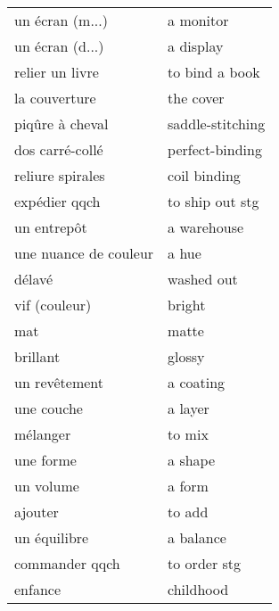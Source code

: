 \documentclass[
  10pt,
]{article}
\begin{document}
\begin{longtable}{ll}
un écran (m...) & a monitor\\

\rowcolor{gray!6}  un écran (d...) & a display\\

relier un livre & to bind a book\\

\rowcolor{gray!6}  la couverture & the cover\\

piqûre à cheval & saddle-stitching\\

\rowcolor{gray!6}  dos carré-collé & perfect-binding\\

reliure spirales & coil binding\\

\rowcolor{gray!6}  expédier qqch & to ship out stg\\

un entrepôt & a warehouse\\

\rowcolor{gray!6}  une nuance de couleur & a hue\\

délavé & washed out\\

\rowcolor{gray!6}  vif (couleur) & bright\\

mat & matte\\

\rowcolor{gray!6}  brillant & glossy\\

un revêtement & a coating\\

\rowcolor{gray!6}  une couche & a layer\\

mélanger & to mix\\

\rowcolor{gray!6}  une forme & a shape\\

un volume & a form\\

\rowcolor{gray!6}  ajouter & to add\\

un équilibre & a balance\\

\rowcolor{gray!6}  commander qqch & to order stg\\

enfance & childhood\\


\end{longtable}
\end{document}
